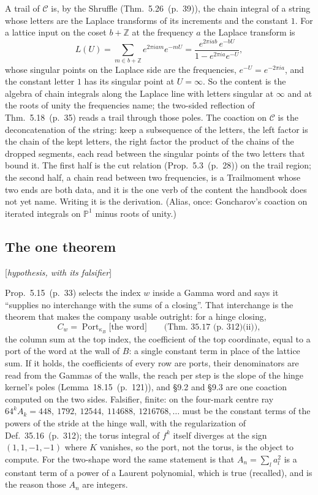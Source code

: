 \documentclass[11pt]{article}
\newcommand{\status}[1]{\hfill{\small[\textit{#1}]}}
\newcommand{\hb}[2]{#1~(p.~#2)}   %
\theoremstyle{plain}
\theoremstyle{remark}
\begin{document}
A trail of $\mathcal C$ is, by the Shruffle (Thm.~\hb{5.26}{39}), the chain integral of a string whose letters are the Laplace transforms of its increments and the constant $1$. For a lattice input on the coset $b+\mathbb Z$ at the frequency $a$ the Laplace transform is
\[
L(U)=\sum_{m\in b+\mathbb Z}e^{2\pi iam}e^{-mU}=\frac{e^{2\pi iab}\,e^{-bU}}{1-e^{2\pi ia}e^{-U}},
\]
whose singular points on the Laplace side are the frequencies, $e^{-U}=e^{-2\pi ia}$, and the constant letter $1$ has its singular point at $U=\infty$. So the content is the algebra of chain integrals along the Laplace line with letters singular at $\infty$ and at the roots of unity the frequencies name; the two-sided reflection of Thm.~\hb{5.18}{35} reads a trail through those poles. The coaction on $\mathcal C$ is the deconcatenation of the string: keep a subsequence of the letters, the left factor is the chain of the kept letters, the right factor the product of the chains of the dropped segments, each read between the singular points of the two letters that bound it. The first half is the cut relation (Prop.~\hb{5.3}{28}) on the trail region; the second half, a chain read between two frequencies, is a Trailmoment whose two ends are both data, and it is the one verb of the content the handbook does not yet name. Writing it is the derivation. (Alias, once: Goncharov's coaction on iterated integrals on $\mathbb P^1$ minus roots of unity.)

\subsection{The one theorem}\status{hypothesis, with its falsifier}

Prop.~\hb{5.15}{33} selects the index $w$ inside a Gamma word and says it ``supplies no interchange with the sums of a closing''. That interchange is the theorem that makes the company usable outright: for a hinge closing,
\[
C_w=\operatorname{Port}_{\kappa_B}\big[\text{the word}\big]\qquad\text{(Thm.~\hb{35.17}{312}(ii))},
\]
the column sum at the top index, the coefficient of the top coordinate, equal to a port of the word at the wall of $B$: a single constant term in place of the lattice sum. If it holds, the coefficients of every row are ports, their denominators are read from the Gammas of the walls, the reach per step is the slope of the hinge kernel's poles (Lemma~\hb{18.15}{121}), and \S9.2 and \S9.3 are one coaction computed on the two sides. Falsifier, finite: on the four-mark centre ray $64^kA_k=448,\ 1792,\ 12544,\ 114688,\ 1216768,\dots$ must be the constant terms of the powers of the stride at the hinge wall, with the regularization of Def.~\hb{35.16}{312}; the torus integral of $f^k$ itself diverges at the sign $(1,1,-1,-1)$ where $K$ vanishes, so the port, not the torus, is the object to compute. For the two-shape word the same statement is that $A_n=\sum_la_l^2$ is a constant term of a power of a Laurent polynomial, which is true (recalled), and is the reason those $A_n$ are integers.
\end{document}
